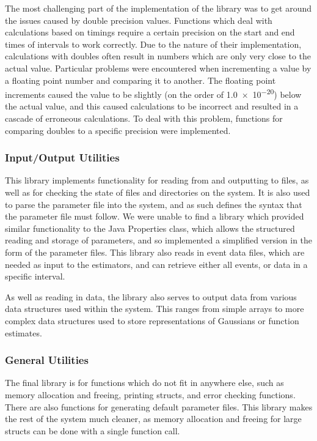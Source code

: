 \documentclass[a4paper,11pt,twoside]{article}
\begin{document}
    The most challenging part of the implementation of the library was to get
    around the issues caused by double precision values. Functions which deal
    with calculations based on timings require a certain precision on the start
    and end times of intervals to work correctly. Due to the nature of their
    implementation, calculations with doubles often result in numbers which are
    only very close to the actual value. Particular problems were encountered
    when incrementing a value by a floating point number and comparing it to
    another. The floating point increments caused the value to be slightly (on
    the order of \num{1.0e-20}) below the actual value, and this caused
    calculations to be incorrect and resulted in a cascade of erroneous
    calculations. To deal with this problem, functions for comparing doubles to
    a specific precision were implemented.
\subsubsection{Input/Output Utilities}
\label{sec-6-3-3}

    This library implements functionality for reading from and outputting to
    files, as well as for checking the state of files and directories on the
    system. It is also used to parse the parameter file into the system, and as
    such defines the syntax that the parameter file must follow. We were unable
    to find a library which provided similar functionality to the Java
    Properties class, which allows the structured reading and storage of
    parameters, and so implemented a simplified version in the form of the
    parameter files. This library also reads in event data files, which are
    needed as input to the estimators, and can retrieve either all events, or
    data in a specific interval.

    As well as reading in data, the library also serves to output data from
    various data structures used within the system. This ranges from simple
    arrays to more complex data structures used to store representations of
    Gaussians or function estimates.
\subsubsection{General Utilities}
\label{sec-6-3-4}

    The final library is for functions which do not fit in anywhere else, such
    as memory allocation and freeing, printing structs, and error checking
    functions. There are also functions for generating default parameter
    files. This library makes the rest of the system much cleaner, as memory
    allocation and freeing for large structs can be done with a single function
    call. 
\end{document}
